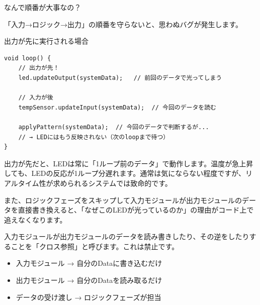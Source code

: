 \begin{qabox}{なんで順番が大事なの？}

「入力→ロジック→出力」の順番を守らないと、思わぬバグが発生します。

\begin{badexample}{出力が先に実行される場合}
\begin{lstlisting}
void loop() {
    // 出力が先！
    led.updateOutput(systemData);   // 前回のデータで光ってしまう

    // 入力が後
    tempSensor.updateInput(systemData);  // 今回のデータを読む

    applyPattern(systemData);  // 今回のデータで判断するが...
    // → LEDにはもう反映されない（次のloopまで待つ）
}
\end{lstlisting}
\end{badexample}

出力が先だと、LEDは常に「1ループ前のデータ」で動作します。温度が急上昇しても、LEDの反応が1ループ分遅れます。通常は気にならない程度ですが、リアルタイム性が求められるシステムでは致命的です。

また、ロジックフェーズをスキップして入力モジュールが出力モジュールのデータを直接書き換えると、「なぜこのLEDが光っているのか」の理由がコード上で追えなくなります。

\begin{cautionbox}[クロス参照の禁止]
入力モジュールが出力モジュールのデータを読み書きしたり、その逆をしたりすることを「クロス参照」と呼びます。これは禁止です。

\begin{itemize}
  \item 入力モジュール → 自分のDataに書き込むだけ
  \item 出力モジュール → 自分のDataを読み取るだけ
  \item データの受け渡し → ロジックフェーズが担当
\end{itemize}
\end{cautionbox}

\end{qabox}

